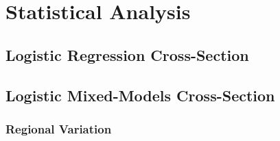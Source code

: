 \section{Statistical Analysis}
\subsection{Logistic Regression Cross-Section}


\subsection{Logistic Mixed-Models Cross-Section}
\subsubsection{Regional Variation}